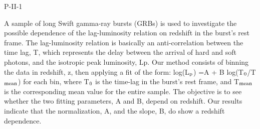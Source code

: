 P-II-1


\bigskip



\bigskip

\noindent A sample of long Swift gamma-ray bursts (GRBs) is used to investigate the possible dependence of the lag-luminosity relation on redshift in the burst's rest frame. The lag-luminosity relation is basically an anti-correlation between the time lag, T, which represents the delay between the arrival of hard and soft photons, and the isotropic peak luminosity, Lp. Our method consists of binning the data in redshift, z, then applying a fit of the form: log(L$_{\rm p}$) =A + B log(T$_{\rm 0}$/T$_{\rm mean}$) for each bin, where T$_{\rm 0}$ is the time-lag in the burst’s rest frame, and T$_{\rm mean}$ is the corresponding mean value for the entire sample. The objective is to see whether the two fitting parameters, A and B, depend on redshift. Our results indicate that the normalization, A, and the slope, B, do show a redshift dependence.

